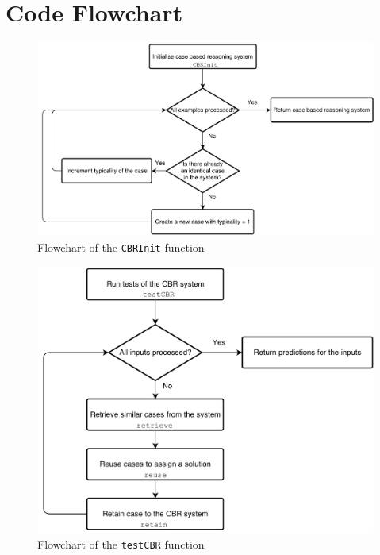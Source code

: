 \documentclass[a4paper]{article}
\begin{document}
\clearpage


\section{Code Flowchart}

\begin{figure}[H]
\center
\includegraphics[width=0.9\columnwidth]{CBRInit}
\caption{Flowchart of the \texttt{CBRInit} function}
\label{flowchartCBRInit}
\end{figure}

\begin{figure}[H]
\center
\includegraphics[width=0.9\columnwidth]{testCBR}
\caption{Flowchart of the \texttt{testCBR} function}
\label{flowchartTestCBR}
\end{figure}

\clearpage

\end{document}
